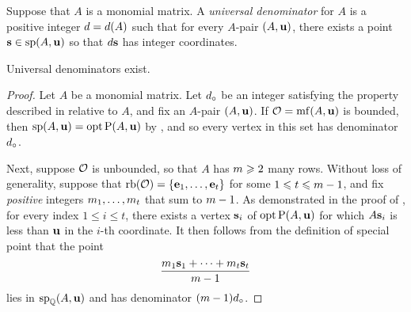 \documentclass{amsart}
\begin{document}

\begin{definition}
   \label{universal denominator: D}
   Suppose that $A$ is a monomial matrix.
   A \emph{universal denominator} for $A$ is a positive integer $d = d(A)$ such that for every $A$-pair $(A, \mathbf{u})$, there exists a point $\mathbf{s} \in \operatorname{sp}(A, \mathbf{u})$ so that $d \mathbf{s}$ has integer coordinates.
\end{definition}

\begin{theorem}
\label{universal-denominators-exist:  T}
Universal denominators exist.
\end{theorem}

\begin{proof}
   Let $A$ be a monomial matrix.
   Let $d_{\circ}$ be an integer satisfying the property described in  relative to $A$, and fix an $A$-pair $(A, \mathbf{u})$.
   If $\mathcal{O} = \operatorname{mf}(A, \mathbf{u})$ is bounded, then $\operatorname{sp}(A, \mathbf{u}) = \operatorname{opt} \mathrm{P}(A, \mathbf{u})$ by , and so every vertex in this set has denominator~$d_{\circ}$.

   Next, suppose $\mathcal{O}$ is unbounded, so that $A$ has $m \geqslant 2$ many rows.
   Without loss of generality, suppose that $\operatorname{rb}(\mathcal{O}) = \{ \mathbf{e}_1, \ldots, \mathbf{e}_t \}$ for some $1 \leqslant t \leqslant m-1$, and fix \emph{positive} integers $m_1, \ldots, m_t$ that sum to $m-1$.
   As demonstrated in the  proof of , for every index  $1 \leq i \leq t$, there exists a vertex $\mathbf{s}_i$ of $\operatorname{opt} \mathrm{P}(A, \mathbf{u})$ for which $A \mathbf{s}_i$ is less than $\mathbf{u}$ in the $i$-th coordinate.
   It then follows from the definition of special point that the point
   \[ \frac{ m_1 \mathbf{s}_1 + \cdots + m_t  \mathbf{s}_t}{m-1}  \]
   lies in $\operatorname{sp}_{\mathbb{Q}}(A, \mathbf{u})$ and has denominator $(m-1)d_{\circ}$.
\end{proof}
\end{document}
